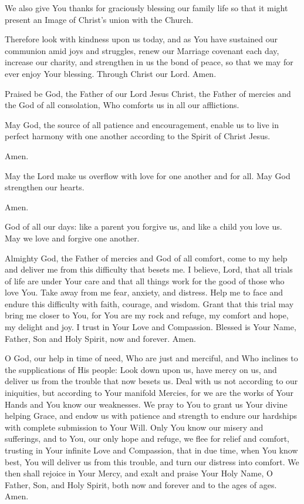 We also give You thanks for graciously blessing our family life so that it might present an Image of Christ's union with the Church.

Therefore look with kindness upon us today, and as You have sustained our communion amid joys and struggles, renew our Marriage covenant each day, increase our charity, and strengthen in us the bond of peace, so that we may for ever enjoy Your blessing.
Through Christ our Lord. Amen.

\label{prayer:times_of_trouble}
Praised be God, the Father of our Lord Jesus Christ, the Father of mercies and the God of all consolation, Who comforts us in all our afflictions.

May God, the source of all patience and encouragement, enable us to live in perfect harmony with one another according to the Spirit of Christ Jesus.

\response Amen.

May the Lord make us overflow with love for one another and for all.
May God strengthen our hearts.

\response Amen.

God of all our days: like a parent you forgive us, and like a child you love us.
May we love and forgive one another.

Almighty God, the Father of mercies and God of all comfort, come to my help and deliver me from this difficulty that besets me.
I believe, Lord, that all trials of life are under Your care and that all things work for the good of those who love You.
Take away from me fear, anxiety, and distress.
Help me to face and endure this difficulty with faith, courage, and wisdom.
Grant that this trial may bring me closer to You, for You are my rock and refuge, my comfort and hope, my delight and joy.
I trust in Your Love and Compassion.
Blessed is Your Name, Father, Son and Holy Spirit, now and forever. Amen.

O God, our help in time of need, Who are just and merciful, and Who inclines to the supplications of His people:
Look down upon us, have mercy on us, and deliver us from the trouble that now besets us.
Deal with us not according to our iniquities, but according to Your manifold Mercies, for we are the works of Your Hands and You know our weaknesses.
We pray to You to grant us Your divine helping Grace, and endow us with patience and strength to endure our hardships with complete submission to Your Will.
Only You know our misery and sufferings, and to You, our only hope and refuge, we flee for relief and comfort, trusting in Your infinite Love and Compassion, that in due time, when You know best, You will deliver us from this trouble, and turn our distress into comfort.
We then shall rejoice in Your Mercy, and exalt and praise Your Holy Name, O Father, Son, and Holy Spirit, both now and forever and to the ages of ages.
Amen.

